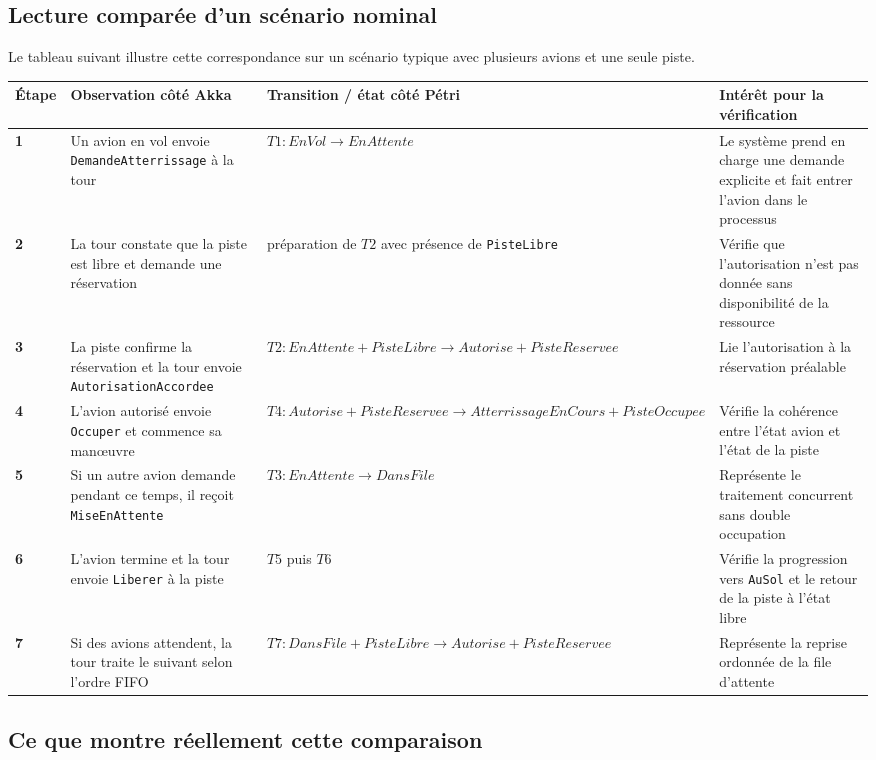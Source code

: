 \documentclass[11pt,a4paper]{article}
\begin{document}
\subsection{Lecture comparée d'un scénario nominal}

Le tableau suivant illustre cette correspondance sur un scénario typique avec plusieurs avions et une seule piste.

\begin{longtable}{>{\bfseries}p{1.1cm} p{4.6cm} p{3.2cm} p{5.6cm}}
\toprule
Étape & Observation côté Akka & Transition / état côté Pétri & Intérêt pour la vérification \\
\midrule
1 & Un avion en vol envoie \texttt{DemandeAtterrissage} à la tour & $T1 : EnVol \rightarrow EnAttente$ & Le système prend en charge une demande explicite et fait entrer l'avion dans le processus \\
2 & La tour constate que la piste est libre et demande une réservation & préparation de $T2$ avec présence de \texttt{PisteLibre} & Vérifie que l'autorisation n'est pas donnée sans disponibilité de la ressource \\
3 & La piste confirme la réservation et la tour envoie \texttt{AutorisationAccordee} & $T2 : EnAttente + PisteLibre \rightarrow Autorise + PisteReservee$ & Lie l'autorisation à la réservation préalable \\
4 & L'avion autorisé envoie \texttt{Occuper} et commence sa manœuvre & $T4 : Autorise + PisteReservee \rightarrow AtterrissageEnCours + PisteOccupee$ & Vérifie la cohérence entre l'état avion et l'état de la piste \\
5 & Si un autre avion demande pendant ce temps, il reçoit \texttt{MiseEnAttente} & $T3 : EnAttente \rightarrow DansFile$ & Représente le traitement concurrent sans double occupation \\
6 & L'avion termine et la tour envoie \texttt{Liberer} à la piste & $T5$ puis $T6$ & Vérifie la progression vers \texttt{AuSol} et le retour de la piste à l'état libre \\
7 & Si des avions attendent, la tour traite le suivant selon l'ordre FIFO & $T7 : DansFile + PisteLibre \rightarrow Autorise + PisteReservee$ & Représente la reprise ordonnée de la file d'attente \\
\bottomrule
\end{longtable}

\subsection{Ce que montre réellement cette comparaison}
\end{document}
